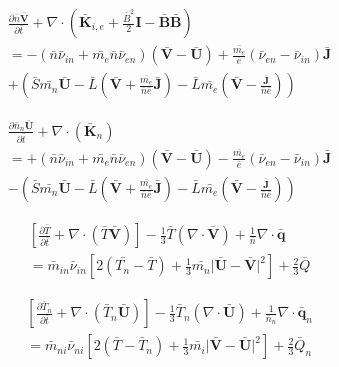 \documentclass[12pt,upcase]{umlthesis}
\begin{document}
\begin{equation}\label{eq:normmomentumcom}
\begin{aligned}
	&\frac{\partial \bar{n} \bar{\textbf{V}}}{\partial \bar{t}} + \nabla \cdot (\bar{\textbf{K}}_{i,e} + \frac{\bar{B}^2}{2}\textbf{I} - \bar{\textbf{B}}\bar{\textbf{B}}) \\
	&= - (\bar{n} \bar{\nu}_{in} + \bar{m_e} \bar{n} \bar{\nu}_{en})(\bar{\textbf{V}} - \bar{\textbf{U}}) + \frac{\bar{m_e}}{\bar{e}}(\bar{\nu}_{en}-\bar{\nu}_{in}) \bar{\textbf{J}}  \\
	&+ (\bar{S} \bar{m_n} \bar{\textbf{U}} - \bar{L} (\bar{\textbf{V}}+ \frac{\bar{m_e}}{\bar{n}\bar{e}}\bar{\textbf{J}}) - \bar{L} \bar{m_e} (\bar{\textbf{V}} -\frac{\bar{\textbf{J}}}{\bar{n}\bar{e}}) )
\end{aligned} 
\end{equation}

\begin{equation}\label{eq:normmomentumneutral}
	\begin{aligned}
	&\frac{\partial \bar{n}_n \bar{\textbf{U}}}{\partial \bar{t}} + \nabla \cdot (\bar{\textbf{K}}_n) \\
	&= + (\bar{n} \bar{\nu}_{in} + \bar{m_e} \bar{n} \bar{\nu}_{en})(\bar{\textbf{V}} - \bar{\textbf{U}}) - \frac{\bar{m_e}}{\bar{e}}(\bar{\nu}_{en}-\bar{\nu}_{in}) \bar{\textbf{J}}  \\
	&- (\bar{S} \bar{m_n} \bar{\textbf{U}} - \bar{L} (\bar{\textbf{V}}+ \frac{\bar{m_e}}{\bar{n}\bar{e}}\bar{\textbf{J}}) - \bar{L} \bar{m_e} (\bar{\textbf{V}} -\frac{\bar{\textbf{J}}}{\bar{n}\bar{e}}) )
	\end{aligned}
\end{equation}

\begin{equation}\label{eq:normtemperatureion}
	\begin{aligned}
		&[\frac{\partial\bar{T}}{\partial \bar{t}} + \nabla\cdot(\bar{T} \bar{\textbf{V}})] - \frac{1}{3}\bar{T} (\nabla\cdot\bar{\textbf{V}}) + \frac{1}{\bar{n}}\nabla\cdot\bar{\textbf{q}} \\
		& = \bar{m}_{in} \bar{\nu}_{in} [2(\bar{T_n} - \bar{T}) + \frac{1}{3}\bar{m_n} \lvert \bar{\textbf{U}} - \bar{\textbf{V}} \rvert^2 ] + \frac{2}{3}\bar{Q}
	\end{aligned}
\end{equation}

\begin{equation}\label{eq:normtemperatureneutral}
	\begin{aligned}
		&[\frac{\partial\bar{T}_n}{\partial \bar{t}} + \nabla\cdot(\bar{T}_n \bar{\textbf{U}})] - \frac{1}{3}\bar{T}_n (\nabla\cdot\bar{\textbf{U}}) + \frac{1}{\bar{n}_n}\nabla\cdot\bar{\textbf{q}}_n \\
		& = \bar{m}_{ni} \bar{\nu}_{ni} [2(\bar{T} - \bar{T}_n) + \frac{1}{3}\bar{m_i} \lvert \bar{\textbf{V}} - \bar{\textbf{U}} \rvert^2 ] + \frac{2}{3}\bar{Q}_n
	\end{aligned}
\end{equation}
\end{document}
